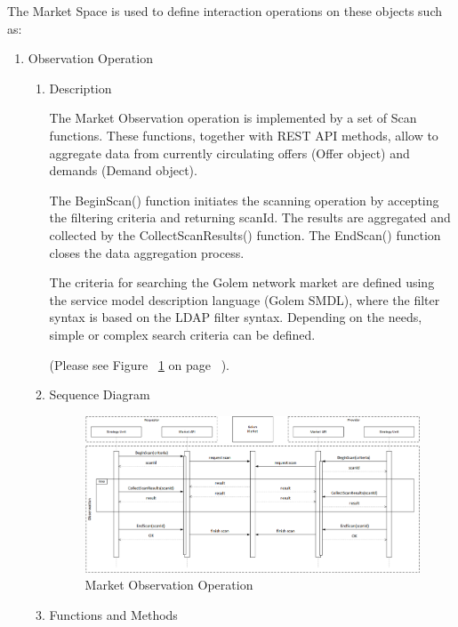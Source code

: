 \break

The Market Space is used to define interaction operations on these objects such as:

\begin{enumerate}
\item  Observation Operation

\begin{enumerate}

\item Description

The Market Observation operation is implemented by a set of Scan functions. 
These functions, together with REST API methods, allow to aggregate data from currently circulating 
offers (Offer object) and demands (Demand object).

The BeginScan() function initiates the scanning operation by accepting the filtering criteria and 
returning scanId. The results are aggregated and collected by the CollectScanResults() function.
The EndScan() function closes the data aggregation process.

The criteria for searching the Golem network market are defined using the service model description language (Golem SMDL),
where the filter syntax is based on the LDAP filter syntax. Depending on the needs, simple or complex search criteria can be defined.

(Please see Figure ~\ref{fig:MOO} on page ~\pageref{fig:MOO}).

\item Sequence Diagram

\begin{figure}[H]
    \centering
    \includegraphics[width=14cm,angle=0]{./diag/Sequence/MarketObservation-B-Sequence.png}
	\caption{Market Observation Operation}
    \label{fig:MOO}
\end{figure}

\item Functions and Methods


\end{enumerate}
\end{enumerate}
